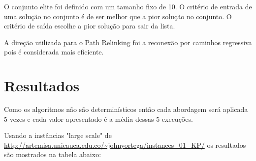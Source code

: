 \documentclass[11pt]{article}
\begin{document}
O conjunto elite foi definido com um tamanho fixo de 10. O critério de entrada de uma solução no conjunto é de ser melhor que a pior solução no conjunto. O critério de saída escolhe a pior solução para sair da lista.

A direção utilizada para o Path Relinking foi a reconexão por caminhos regressiva pois é considerada mais eficiente.

\section{Resultados}
\label{sec:orgec04dac}
Como os algoritmos não são determinísticos então cada abordagem será aplicada 5 vezes e cada valor apresentado é a média dessas 5 execuções.

Usando a instâncias "large scale" de \url{http://artemisa.unicauca.edu.co/\~johnyortega/instances\_01\_KP/} os resultados são mostrados na tabela abaixo:
\end{document}
